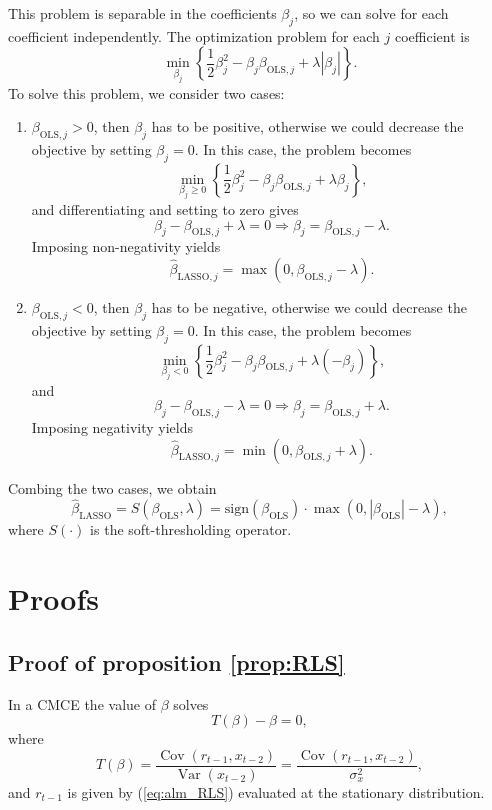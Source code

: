 \documentclass[11pt]{article}
\begin{document}
This problem is separable in the coefficients $\beta_j$, so we can solve for each coefficient independently. The optimization problem for each $j$ coefficient is
\[\min_{\beta_j} \left\{\frac{1}{2} \beta_j^2 - \beta_j \beta_{\text{OLS},j} + \lambda |\beta_j| \right\}.\]
To solve this problem, we consider two cases:
\begin{enumerate}
    \item $\beta_{\text{OLS},j} > 0$, then $\beta_j$ has to be positive, otherwise we could decrease the objective by setting $\beta_j = 0$. 
    In this case, the problem becomes 
    \[\min_{\beta_j \geq 0} \left\{ \frac{1}{2} \beta_j^2 - \beta_j \beta_{\text{OLS},j} + \lambda \beta_j \right\},\]
    and differentiating and setting to zero gives
    \[\beta_j - \beta_{\text{OLS},j} + \lambda = 0 \Rightarrow \beta_j = \beta_{\text{OLS},j} - \lambda.\]
    Imposing non-negativity yields
    \[\hat{\beta}_{\text{LASSO},j} = \max\left(0, \beta_{\text{OLS},j} - \lambda\right).\]
    \item $\beta_{\text{OLS},j} < 0$, then $\beta_j$ has to be negative, otherwise we could decrease the objective by setting $\beta_j = 0$. In this case, the problem becomes
    \[\min_{\beta_j < 0} \left\{ \frac{1}{2} \beta_j^2 - \beta_j \beta_{\text{OLS},j} + \lambda (-\beta_j) \right\},\]    
    and
    \[\beta_j - \beta_{\text{OLS},j} - \lambda = 0 \Rightarrow \beta_j = \beta_{\text{OLS},j} + \lambda.\]
    Imposing negativity yields
    \[\hat{\beta}_{\text{LASSO},j} = \min\left(0, \beta_{\text{OLS},j} + \lambda\right).\]
\end{enumerate}

Combing the two cases, we obtain 
\begin{equation}
\hat{\beta}_{\text{LASSO}} = S(\beta_{\text{OLS}}, \lambda) = \textrm{sign}(\beta_{\text{OLS}}) \cdot \max\left(0, |\beta_{\text{OLS}}| - \lambda\right),
\end{equation}
where $S(\cdot)$ is the soft-thresholding operator.


\section{Proofs}\label{sec:proofs}
\subsection{Proof of proposition \ref{prop:RLS}}\label{app:proof_RLS}

In a CMCE the value of $\beta$ solves
\begin{equation}
    T(\beta) - \beta = 0,
\end{equation}
where 
\begin{equation}
    T(\beta) = \frac{\operatorname{Cov}(r_{t-1}, x_{t-2})}{\operatorname{Var}(x_{t-2})} = \frac{\operatorname{Cov}(r_{t-1}, x_{t-2})}{\sigma^2_x},
\end{equation}
and $r_{t-1}$ is given by (\ref{eq:alm_RLS}) evaluated at the stationary distribution.
\end{document}
